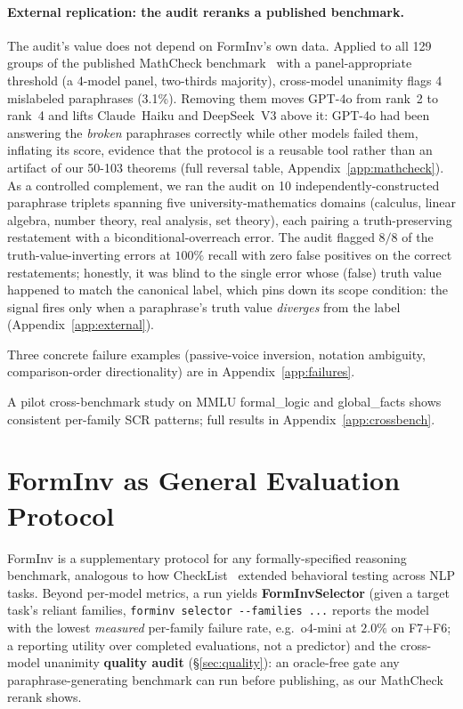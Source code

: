 \documentclass{article}
\begin{document}
\paragraph{External replication: the audit reranks a published benchmark.}
The audit's value does not depend on FormInv's own data. Applied to all 129 groups of the
published MathCheck benchmark~\citep{zhou2024mathcheck} with a panel-appropriate threshold (a
4-model panel, two-thirds majority), cross-model unanimity flags 4 mislabeled paraphrases
(3.1\%). Removing them moves GPT-4o from rank~2 to rank~4 and lifts Claude~Haiku and
DeepSeek~V3 above it: GPT-4o had been answering the \emph{broken} paraphrases correctly while
other models failed them, inflating its score, evidence that the protocol is a reusable tool
rather than an artifact of our 50-103 theorems (full reversal table, Appendix~\ref{app:mathcheck}).
As a controlled complement, we ran the audit
on 10 independently-constructed paraphrase triplets spanning five university-mathematics domains
(calculus, linear algebra, number theory, real analysis, set theory), each pairing a truth-preserving
restatement with a biconditional-overreach error. The audit flagged $8/8$ of the truth-value-inverting
errors at $100\%$ recall with zero false positives on the correct restatements; honestly, it was blind
to the single error whose (false) truth value happened to match the canonical label, which pins down
its scope condition: the signal fires only when a paraphrase's truth value \emph{diverges} from the
label (Appendix~\ref{app:external}).

Three concrete failure examples (passive-voice inversion, notation ambiguity, comparison-order directionality) are in Appendix~\ref{app:failures}.

A pilot cross-benchmark study on MMLU formal\_logic and global\_facts shows consistent per-family SCR patterns; full results in Appendix~\ref{app:crossbench}.

\section{FormInv as General Evaluation Protocol}
\label{sec:protocol}

FormInv is a supplementary protocol for any formally-specified reasoning benchmark, analogous to how CheckList~\citep{ribeiro2020checklist} extended behavioral testing across NLP tasks. Beyond per-model metrics, a run yields \textbf{FormInvSelector} (given a target task's reliant families, \texttt{forminv selector -{}-families ...} reports the model with the lowest \emph{measured} per-family failure rate, e.g.\ o4-mini at $2.0\%$ on F7+F6; a reporting utility over completed evaluations, not a predictor) and the cross-model unanimity \textbf{quality audit} (\S\ref{sec:quality}): an oracle-free gate any paraphrase-generating benchmark can run before publishing, as our MathCheck rerank shows.
\end{document}
